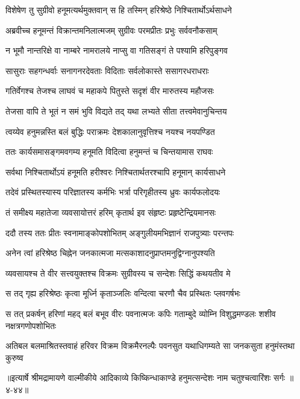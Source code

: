 
\twolineshloka
{विशेषेण तु सुग्रीवो हनूमत्यर्थमुक्तवान्}
{स हि तस्मिन् हरिश्रेष्ठे निश्चितार्थोऽर्थसाधने} %

\twolineshloka
{अब्रवीच्च हनूमन्तं विक्रान्तमनिलात्मजम्}
{सुग्रीवः परमप्रीतः प्रभुः सर्ववनौकसाम्} %

\twolineshloka
{न भूमौ नान्तरिक्षे वा नाम्बरे नामरालये}
{नाप्सु वा गतिसङ्गं ते पश्यामि हरिपुङ्गव} %

\twolineshloka
{सासुराः सहगन्धर्वाः सनागनरदेवताः}
{विदिताः सर्वलोकास्ते ससागरधराधराः} %

\twolineshloka
{गतिर्वेगश्च तेजश्च लाघवं च महाकपे}
{पितुस्ते सदृशं वीर मारुतस्य महौजसः} %

\twolineshloka
{तेजसा वापि ते भूतं न समं भुवि विद्यते}
{तद् यथा लभ्यते सीता तत्त्वमेवानुचिन्तय} %

\twolineshloka
{त्वय्येव हनुमन्नस्ति बलं बुद्धिः पराक्रमः}
{देशकालानुवृत्तिश्च नयश्च नयपण्डित} %

\twolineshloka
{ततः कार्यसमासङ्गमवगम्य हनूमति}
{विदित्वा हनुमन्तं च चिन्तयामास राघवः} %

\twolineshloka
{सर्वथा निश्चितार्थोऽयं हनूमति हरीश्वरः}
{निश्चितार्थतरश्चापि हनूमान् कार्यसाधने} %

\twolineshloka
{तदेवं प्रस्थितस्यास्य परिज्ञातस्य कर्मभिः}
{भर्त्रा परिगृहीतस्य ध्रुवः कार्यफलोदयः} %

\twolineshloka
{तं समीक्ष्य महातेजा व्यवसायोत्तरं हरिम्}
{कृतार्थ इव संहृष्टः प्रहृष्टेन्द्रियमानसः} %

\twolineshloka
{ददौ तस्य ततः प्रीतः स्वनामाङ्कोपशोभितम्}
{अङ्गुलीयमभिज्ञानं राजपुत्र्याः परन्तपः} %

\twolineshloka
{अनेन त्वां हरिश्रेष्ठ चिह्नेन जनकात्मजा}
{मत्सकाशादनुप्राप्तमनुद्विग्नानुपश्यति} %

\twolineshloka
{व्यवसायश्च ते वीर सत्त्वयुक्तश्च विक्रमः}
{सुग्रीवस्य च सन्देशः सिद्धिं कथयतीव मे} %

\twolineshloka
{स तद् गृह्य हरिश्रेष्ठः कृत्वा मूर्ध्नि कृताञ्जलिः}
{वन्दित्वा चरणौ चैव प्रस्थितः प्लवगर्षभः} %

\twolineshloka
{स तत् प्रकर्षन् हरिणां महद् बलं बभूव वीरः पवनात्मजः कपिः}
{गताम्बुदे व्योम्नि विशुद्धमण्डलः शशीव नक्षत्रगणोपशोभितः} %

\twolineshloka
{अतिबल बलमाश्रितस्तवाहं हरिवर विक्रम विक्रमैरनल्पैः}
{पवनसुत यथाधिगम्यते सा जनकसुता हनुमंस्तथा कुरुष्व} %


॥इत्यार्षे श्रीमद्रामायणे वाल्मीकीये आदिकाव्ये किष्किन्धाकाण्डे हनुमत्सन्देशः नाम चतुश्चत्वारिंशः सर्गः ॥४-४४॥
